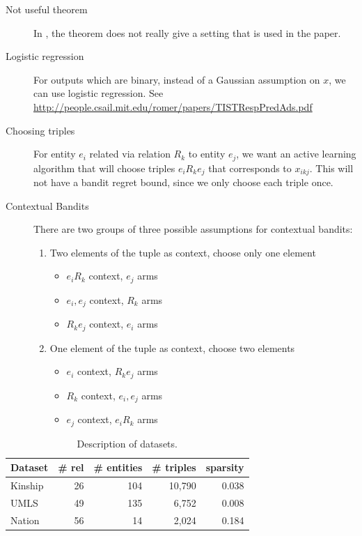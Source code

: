 \documentclass{article}
\begin{document}
\begin{description}
  \item[Not useful theorem] In \cite{kawale2015efficient}, the theorem does not really give
  a setting that is used in the paper.
  \item[Logistic regression] For outputs which are binary, instead of a Gaussian assumption on
  $x$, we can use logistic regression. See
   \url{http://people.csail.mit.edu/romer/papers/TISTRespPredAds.pdf}
  \item[Choosing triples] For entity $e_i$ related via relation $R_k$ to entity $e_j$, we want
  an active learning algorithm that will choose triples $e_i R_k e_j$ that corresponds to
  $x_{ikj}$. This will not have a bandit regret bound, since we only choose each triple once.
  \item[Contextual Bandits] There are two groups of three possible assumptions for contextual
  bandits:
  \begin{enumerate}
    \item Two elements of the tuple as context, choose only one element
    \begin{itemize}
      \item $e_iR_k$ context, $e_j$ arms
      \item $e_i, e_j$ context, $R_k$ arms
      \item $R_ke_j$ context, $e_i$ arms
    \end{itemize}
    \item One element of the tuple as context, choose two elements
    \begin{itemize}
      \item $e_i$ context, $R_k e_j$ arms
      \item $R_k$ context, $e_i, e_j$ arms
      \item $e_j$ context, $e_iR_k$ arms
    \end{itemize}
  \end{enumerate}
\end{description}

\begin{table}
\centering
\caption{\label{tbl:dataset}Description of datasets.}
\begin{tabular}{l | r | r | r | r}
Dataset &  \# rel & \# entities & \# triples & sparsity \\ \hline
Kinship & 26 & 104  & 10,790 & 0.038 \\
UMLS & 49 &135  & 6,752 & 0.008 \\
Nation & 56 & 14  & 2,024 & 0.184 \\
\end{tabular}
\end{table}
\end{document}
